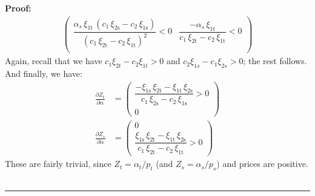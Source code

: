 \documentclass[11pt,a4paper]{extarticle}
\newenvironment{proof}[1][Proof]{\noindent\textbf{#1:} }{\ \rule{0.5em}{0.5em}}
\begin{document}
\begin{proof}
\begin{align*}
\begin{pmatrix}
	\dfrac{\alpha _{s}\,\xi _{\mathrm{1t}}\,\left(c_{1}\,\xi _{\mathrm{2s}}-c_{2}\,\xi _{\mathrm{1s}}\right)}{{\left(c_{1}\,\xi _{\mathrm{2t}}-c_{2}\,\xi _{\mathrm{1t}}\right)}^2} < 0& \dfrac{-\alpha _{s}\,\xi _{\mathrm{1t}}}{c_{1}\,\xi _{\mathrm{2t}}-c_{2}\,\xi _{\mathrm{1t}}} <0\\
	\end{pmatrix}
	\end{align*}
	Again, recall that we have $c_1 \xi_{2t} - c_2 \xi_{1t} > 0$ and $c_2 \xi_{1s} - c_1 \xi_{2s} > 0$; the rest follows. And finally, we have:
	\begin{align*}
	\frac{\partial Z_t}{\partial \alpha} &= 
	\begin{pmatrix}
	\dfrac{-\xi _{\mathrm{1s}}\,\xi _{\mathrm{2t}}-\xi _{\mathrm{1t}}\,\xi _{\mathrm{2s}}}{c_{1}\,\xi _{\mathrm{2s}}-c_{2}\,\xi _{\mathrm{1s}}} > 0  \\
	0
	\end{pmatrix} \\
	\frac{\partial Z_s}{\partial \alpha} &= 
	\begin{pmatrix}
	0 \\
	\dfrac{\xi _{\mathrm{1s}}\,\xi _{\mathrm{2t}}-\xi _{\mathrm{1t}}\,\xi _{\mathrm{2s}}}{c_{1}\,\xi _{\mathrm{2t}}-c_{2}\,\xi _{\mathrm{1t}}} > 0
	\end{pmatrix}
	\end{align*}
	These are fairly trivial, since $Z_t = \alpha_t / p_t$ (and $Z_s = \alpha_s/ p_s$) and prices are positive. \\
	\hfill
\end{proof}
\end{document}

